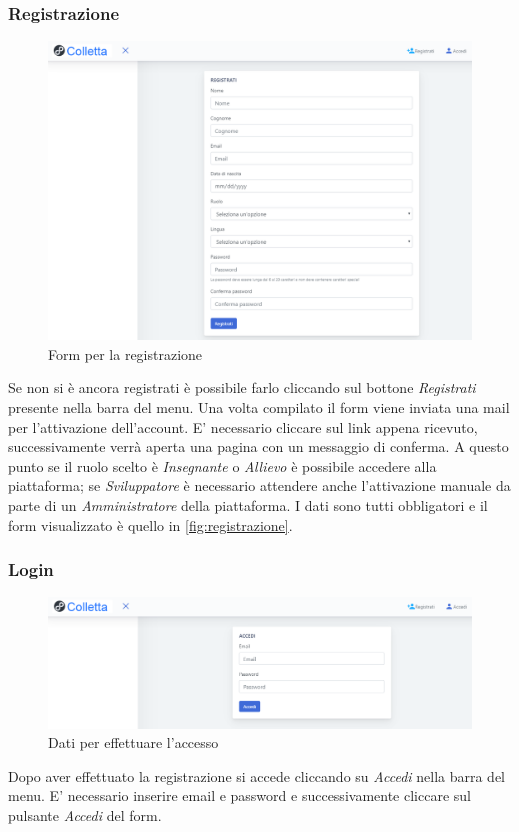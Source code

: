     \subsubsection{Registrazione}
    	\begin{figure}[H]
        	\centering
        	\includegraphics[width=1\linewidth]{sez/img/autenticazione/formRegistrazione.PNG} 
        	\caption{Form per la registrazione}\label{fig:registrazione}
    	\end{figure}
	  Se non si è ancora registrati è possibile farlo cliccando sul bottone \textit{Registrati} presente nella barra del menu. Una volta compilato il form viene inviata una mail per l'attivazione dell'account. E' necessario cliccare sul link appena ricevuto, successivamente verrà aperta una pagina con un messaggio di conferma. A questo punto se il ruolo scelto è \textit{Insegnante} o \textit{Allievo} è possibile accedere alla piattaforma; se \textit{Sviluppatore} è necessario attendere anche l'attivazione manuale da parte di un  \textit{Amministratore} della piattaforma. I dati sono tutti obbligatori e il form visualizzato è quello in \autoref{fig:registrazione}.\\
    \subsubsection{Login}
    	\begin{figure}[H]
        	\centering
        	\includegraphics[width=1\linewidth]{sez/img/autenticazione/formAccedi.PNG} 
        	\caption{Dati per effettuare l'accesso}\label{fig:1}
    	\end{figure}
 	  Dopo aver effettuato la registrazione si accede cliccando su \textit{Accedi} nella barra del menu. E' necessario inserire email e password e successivamente cliccare sul pulsante \textit{Accedi} del form.


